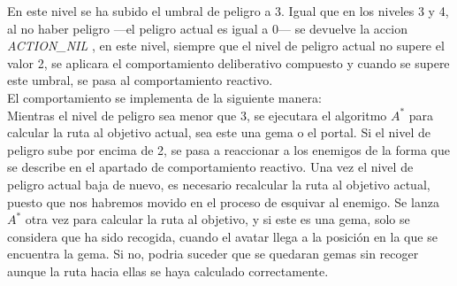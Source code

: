 En este nivel se ha subido el umbral de peligro a 3. Igual que en los niveles 3 y 4, al no haber peligro ---el peligro actual es igual a 0--- se devuelve la accion \emph{ACTION\_NIL} , en este nivel, siempre que el nivel de peligro actual no supere el valor 2, se aplicara el comportamiento deliberativo compuesto y cuando se supere este umbral, se pasa al comportamiento reactivo.\\

El comportamiento se implementa de la siguiente manera:\\
Mientras el nivel de peligro sea menor que 3, se ejecutara el algoritmo $ A^{*} $ para calcular la ruta al objetivo actual, sea este una gema o el portal. Si el nivel de peligro sube por encima de 2, se pasa a reaccionar a los enemigos de la forma que se describe en el apartado de comportamiento reactivo. Una vez el nivel de peligro actual baja de nuevo, es necesario recalcular la ruta al objetivo actual, puesto que nos habremos movido en el proceso de esquivar al enemigo. Se lanza $ A^{*} $ otra vez para calcular la ruta al objetivo, y si este es una gema, solo se considera que ha sido recogida, cuando el avatar llega a la posición en la que se encuentra la gema. Si no, podria suceder que se quedaran gemas sin recoger aunque la ruta hacia ellas se haya calculado correctamente.
